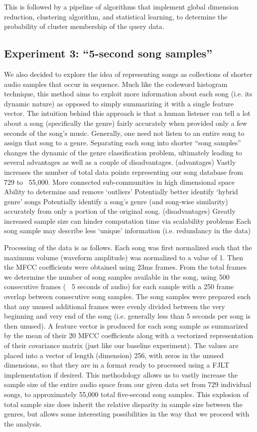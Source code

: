 \documentclass[10pt]{article}
\begin{document}
This is followed by a pipeline of algorithms that implement global dimension reduction, clustering algorithm, and statistical learning, to determine the probability of cluster membership of the query data. 

\subsection{Experiment 3: “5-second song samples”}
We also decided to explore the idea of representing songs as collections of shorter audio samples that occur in sequence.  Much like the codeword histogram technique, this method aims to exploit more information about each song (i.e. its dynamic nature) as opposed to simply summarizing it with a single feature vector.  The intuition behind this approach is that a human listener can tell a lot about a song (specifically the genre) fairly accurately when provided only a few seconds of the song’s music.  Generally, one need not listen to an entire song to assign that song to a genre.  Separating each song into shorter “song samples” changes the dynamic of the genre classification problem, ultimately leading to several advantages as well as a couple of disadvantages.
(advantages)
Vastly increases the number of total data points representing our song database from 729 to ~55,000.
More connected sub-communities in high dimensional space
Ability to determine and remove ‘outliers’
Potentially better identify ‘hybrid genre’ songs
Potentially identify a song’s genre (and song-wise similarity) accurately from only a portion of the original song.
(disadvantages)
Greatly increased sample size can hinder computation time via scalability problems
Each song sample may describe less ‘unique’ information (i.e. redundancy in the data)

Processing of the data is as follows.  Each song was first normalized such that the maximum volume (waveform amplitude) was normalized to a value of 1.  Then the MFCC coefficients were obtained using 23ms frames.  From the total frames we determine the number of song samples available in the song, using 500 consecutive frames (~ 5 seconds of audio) for each sample with a 250 frame overlap between consecutive song samples.  The song samples were prepared such that any unused additional frames were evenly divided between the very beginning and very end of the song (i.e. generally less than 5 seconds per song is then unused).
A feature vector is produced for each song sample as summarized by the mean of their 20 MFCC coefficients along with a vectorized representation of their covariance matrix (just like our baseline experiment).  The values are placed into a vector of length (dimension) 256, with zeros in the unused dimensions, so that they are in a format ready to processed using a FJLT implementation if desired.  
This methodology allows us to vastly increase the sample size of the entire audio space from our given data set from 729 individual songs, to approximately 55,000 total five-second song samples.  This explosion of total sample size does inherit the relative disparity in sample size between the genres, but allows some interesting possibilities in the way that we proceed with the analysis.
\end{document}
